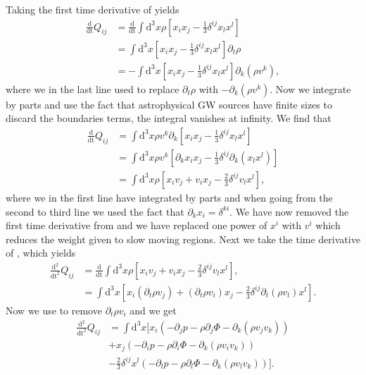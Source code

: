 Taking the first time derivative of  yields
\begin{align} \label{eqT:quaddt}
\frac{\mathrm{d}}{\mathrm{dt}}Q_{ij} &=  \frac{\mathrm{d}}{\mathrm{dt}} 
\int \mathrm{d}^3 x \rho\left [x_i x_j - \frac{1}{3} \delta^{ij} x_l x^l \right ] \nonumber \\ 
& = \int \mathrm{d}^3 x \left [x_i x_j - \frac{1}{3} \delta^{ij} x_l x^l \right ] \partial_t \rho \nonumber \\
& = -\int \mathrm{d}^3 x \left [x_i x_j - \frac{1}{3} \delta^{ij} x_l x^l \right ] \partial_k (\rho v^k),
\end{align}
where we in the last line used  to replace $\partial_t \rho$ with $-\partial_k (\rho v^k)$.
Now we integrate  by parts and use the fact that astrophysical GW sources have finite sizes 
to discard the boundaries terms, the integral vanishes at infinity. We find that
\begin{align} \label{eqT:quaddt2}
\frac{\mathrm{d}}{\mathrm{dt}}Q_{ij} &= \int \mathrm{d}^3 x \rho  v^k \partial_k \left [x_i x_j - \frac{1}{3} \delta^{ij} x_l x^l \right ] \nonumber \\
&= \int \mathrm{d}^3 x \rho v^k \left  [\partial_k x_i x_j - \frac{1}{3} \delta^{ij} \partial_k (x_l x^l) \right ] \nonumber \\
&= \int \mathrm{d}^3 x \rho \left [x_i v_j + v_i x_j - \frac{2}{3} \delta^{ij} v_l x^l \right ],
\end{align}
where we in the first line have integrated by parts and when going from the second to third line we used the fact that
$\partial_k x_i = \delta^{ki}$. We have now removed the first time derivative from  and we have replaced one
power of $x^i$ with $v^i$ which reduces the weight given to slow moving regions.
Next we take the time derivative of , which yields
\begin{align} \label{eqT:quaddtt}
\frac{\mathrm{d}^2}{\mathrm{dt}^2}Q_{ij} &= \frac{\mathrm{d}}{\mathrm{dt}} \int \mathrm{d}^3 x \rho \left  
[x_i v_j + v_i x_j - \frac{2}{3} \delta^{ij} v_l x^l \right ], \nonumber \\
& = \int \mathrm{d}^3 x \left [x_i (\partial_t \rho v_j) +  (\partial_t \rho v_i) x_j - \frac{2}{3} \delta^{ij} \partial_t ( \rho v_l) x^l \right ].
\end{align}
Now we use  to remove $\partial_t \rho v_i$ and we get
\begin{align} \label{eqT:quaddtt2}
\frac{\mathrm{d}^2}{\mathrm{dt}^2} Q_{ij} & = \int \mathrm{d}^3 x \bigg[ x_i (-\partial_j p - \rho \partial_j \Phi - \partial_k (\rho v_j v_k)) \nonumber \\
&+ x_j (-\partial_i p - \rho \partial_i \Phi - \partial_k (\rho v_i v_k)) \nonumber \\
&- \frac{2}{3} \delta^{ij} x^l (-\partial_l p - \rho \partial_l \Phi - \partial_k (\rho v_l v_k)) \bigg].
\end{align}
